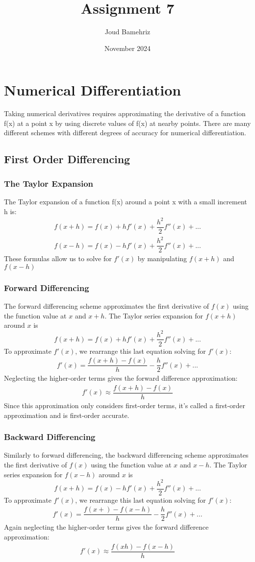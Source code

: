 \documentclass{article}
\title{Assignment 7}
\author{Joud Bamehriz}
\date{November 2024}
\begin{document}
\maketitle
\newpage
\section{Numerical Differentiation}
Taking numerical derivatives requires approximating the derivative of a function f(x) at a point x by using discrete values of f(x) at nearby points. There are many different schemes with different degrees of accuracy for numerical differentiation. 
\subsection{First Order Differencing}
\subsubsection{The Taylor Expansion}
The Taylor expansion of a function f(x) around a point x with a small increment h is:
\begin{align}
  f(x+h)=f(x)+hf'(x)+\dfrac {h^2}{2}f''(x)+...\\
  f(x-h)=f(x)-hf'(x)+\dfrac {h^2}{2}f''(x)+...
\end{align}
These formulas allow us to solve for $f'(x)$ by manipulating $f(x+h)$ and $f(x-h)$ 
\subsubsection{Forward Differencing} 
The forward differencing scheme approximates the first derivative of $f(x)$ using the function value at $x$ and $x+h$. The Taylor series expansion for $f(x+h)$ around $x$ is $$f(x+h)=f(x)+hf'(x)+\dfrac {h^2}{2}f''(x)+...$$ To approximate $f'(x)$, we rearrange this last equation solving for $f'(x)$: 
\begin{align}
  f'(x)=\dfrac {f(x+h)-f(x)}{h}-\dfrac{h}{2}f''(x)+...
\end{align}
Neglecting the higher-order terms gives the forward difference approximation: 
\begin{align}
  f'(x)\approx\dfrac {f(x+h)-f(x)}{h}
\end{align}
Since this approximation only considers first-order terms, it's called a first-order approximation and is first-order accurate. 
\subsubsection{Backward Differencing} 
Similarly to forward differencing, the backward differencing scheme approximates the first derivative of $f(x)$ using the function value at $x$ and $x-h$. The Taylor series expansion for $f(x-h)$ around $x$ is $$f(x+h)=f(x)-hf'(x)+\dfrac {h^2}{2}f''(x)+...$$ To approximate $f'(x)$, we rearrange this last equation solving for $f'(x)$: 
\begin{align}
  f'(x)=\dfrac {f(x+)-f(x-h)}{h}-\dfrac{h}{2}f''(x)+...
\end{align}
Again neglecting the higher-order terms gives the forward difference approximation: 
\begin{align}
  f'(x)\approx\dfrac {f(xh)-f(x-h)}{h}
\end{align}
\end{document}
